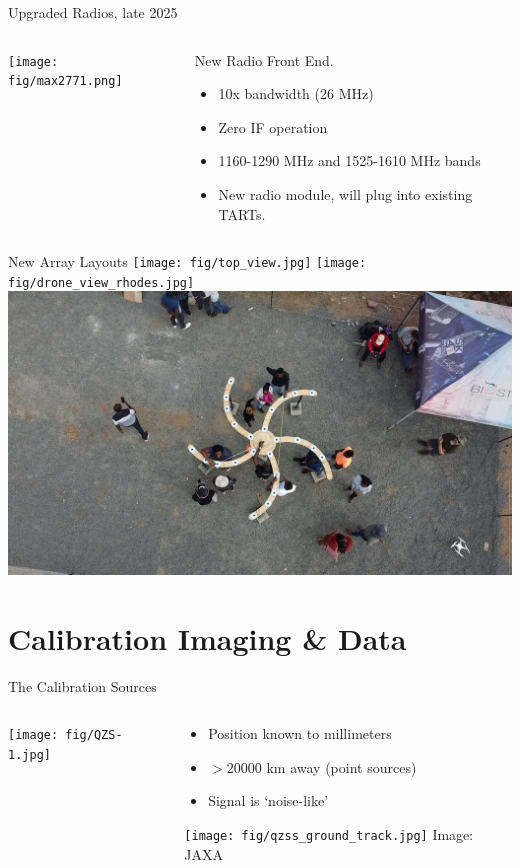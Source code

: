 \documentclass[ignorenonframetext]{beamer}
\begin{document}
\begin{frame}{Upgraded Radios, late 2025}
  \begin{columns}
  \begin{column}{0.4\linewidth}
    \texttt{[image: fig/max2771.png]}
  \end{column}
  \begin{column}{0.6\linewidth}
  New Radio Front End.
\begin{itemize}
 \item 10x bandwidth (26 MHz)
 \item Zero IF operation
 \item 1160-1290 MHz and 1525-1610 MHz bands
 \item New radio module, will plug into existing TARTs.
\end{itemize}

  \end{column}
  \end{columns}
\end{frame}

\begin{frame}{New Array Layouts}
\centering
 \texttt{[image: fig/top\_view.jpg]}
 \texttt{[image: fig/drone\_view\_rhodes.jpg]}
 \includegraphics[width=0.6\linewidth]{fig/biust_from_above.jpg}
\end{frame}

\section{Calibration Imaging \& Data}

\frame{\tableofcontents[currentsection]}


\begin{frame}{The Calibration Sources}
 \begin{columns}
  \begin{column}{0.5\linewidth}
   \texttt{[image: fig/QZS-1.jpg]}
  \end{column}
  \begin{column}{0.5\linewidth}
  \begin{itemize}
   \item Position known to millimeters
   \item $>20000$ km away (point sources)
   \item Signal is `noise-like'
  \end{itemize}
   \texttt{[image: fig/qzss\_ground\_track.jpg]}
   {\tiny Image: JAXA}
  \end{column}
 \end{columns}
\end{frame}
\end{document}
